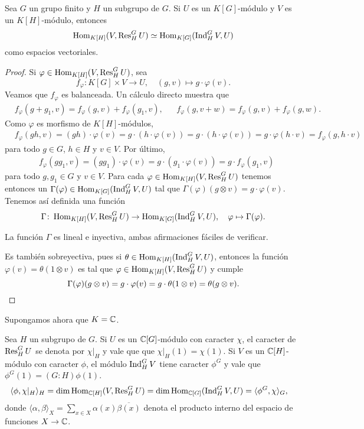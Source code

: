 \begin{theorem}
Sea $G$ un grupo finito y $H$ un subgrupo de $G$. 
Si $U$ es un $K[G]$-módulo y $V$ es un $K[H]$-módulo, entonces
\[
\operatorname{Hom}_{K[H]}(V,\operatorname{Res}_H^GU)\simeq \operatorname{Hom}_{K[G]}(\operatorname{Ind}_H^GV,U)
\]
como espacios vectoriales.
\end{theorem}

\begin{proof}
Si $\varphi\in\operatorname{Hom}_{K[H]}(V,\operatorname{Res}_H^GU)$, sea 
\[
f_{\varphi}\colon K[G]\times V\to U,
\quad
(g,v)\mapsto g\cdot\varphi(v).
\]
Veamos que $f_{\varphi}$ es balanceada. Un cálculo directo muestra que
\begin{align*}
    &f_{\varphi}(g+g_1,v)=f_{\varphi}(g,v)+f_{\varphi}(g_1,v),&&
    f_{\varphi}(g,v+w)=f_{\varphi}(g,v)+f_{\varphi}(g,w).
\end{align*}
Como $\varphi$ es morfismo de $K[H]$-módulos,
\begin{align*}
    &f_{\varphi}(gh,v)=(gh)\cdot\varphi(v)
    =g\cdot (h\cdot \varphi(v))
    =g\cdot (h\cdot\varphi(v))
    =g\cdot \varphi(h\cdot v)=f_{\varphi}(g,h\cdot v)
\end{align*}
para todo $g\in G$, $h\in H$ y $v\in V$. Por último,
\begin{align*}
    &f_{\varphi}(gg_1,v)=(gg_1)\cdot\varphi(v)=g\cdot(g_1\cdot\varphi(v))=g\cdot f_{\varphi}(g_1,v)
\end{align*}
para todo $g,g_1\in G$ y $v\in V$. Para cada $\varphi\in\operatorname{Hom}_{K[H]}(V,\operatorname{Res}_H^GU)$ tenemos 
entonces un $\Gamma(\varphi)\in\operatorname{Hom}_{K[G]}(\operatorname{Ind}_H^GV,U)$ tal que
$\Gamma(\varphi)(g\otimes v)=g\cdot\varphi(v)$. 
Tenemos así definida una función 
\[
\Gamma\colon \operatorname{Hom}_{K[H]}(V,\operatorname{Res}_H^GU)\to\operatorname{Hom}_{K[G]}(\operatorname{Ind}_H^GV,U),
\quad
\varphi\mapsto\Gamma(\varphi).
\]

La función $\Gamma$ es lineal e inyectiva, ambas afirmaciones fáciles de verificar. 

Es también sobreyectiva, pues si $\theta\in\operatorname{Hom}_{K[H]}(\operatorname{Ind}_H^GV,U)$, entonces
la función $\varphi(v)=\theta(1\otimes v)$ es tal que $\varphi\in\operatorname{Hom}_{K[H]}(V,\operatorname{Res}_H^GU)$ y 
cumple 
\[
\Gamma(\varphi)(g\otimes v)=g\cdot\varphi(v)=g\cdot\theta(1\otimes v)=\theta(g\otimes v).\qedhere
\]
\end{proof}

Supongamos ahora que $K=\mathbb{C}$. 

Sea $H$ un subgrupo de $G$. Si $U$ es un $\mathbb{C}[G]$-módulo con caracter $\chi$, el caracter de $\operatorname{Res}_H^GU$ se denota por $\chi|_H$ y vale que 
que $\chi|_H(1)=\chi(1)$. Si $V$ es un $\mathbb{C}[H]$-módulo con 
caracter $\phi$, el módulo $\operatorname{Ind}_H^GV$ tiene caracter $\phi^G$ y vale que $\phi^G(1)=(G:H)\phi(1)$. 
\begin{align*}
\langle \phi,\chi|_H\rangle_H 
&=\dim\operatorname{Hom}_{\mathbb{C}[H]}(V,\operatorname{Res}_H^GU)
=\dim\operatorname{Hom}_{\mathbb{C}[G]}(\operatorname{Ind}_H^GV,U)
=\langle\phi^G,\chi\rangle_G,
\end{align*}
donde $\langle \alpha,\beta\rangle_X=\sum_{x\in X}\alpha(x)\overline{\beta(x)}$ denota el producto 
interno del espacio de funciones $X\to\mathbb{C}$. 


